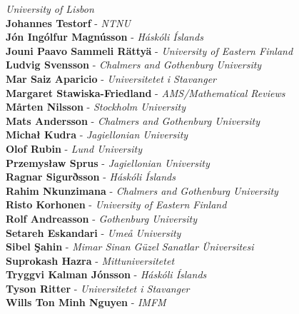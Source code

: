 \documentclass[12pt, openany]{report}      %
\begin{document}
\textit{University of Lisbon}
\\
\textbf{Johannes Testorf} -
\textit{NTNU}
\\
\textbf{Jón Ingólfur Magnússon} -
\textit{Háskóli Íslands}
\\
\textbf{Jouni Paavo Sammeli Rättyä} -
\textit{University of Eastern Finland}
\\
\textbf{Ludvig Svensson} -
\textit{Chalmers and Gothenburg University}
\\
\textbf{Mar Saiz Aparicio} -
\textit{Universitetet i Stavanger}
\\
\textbf{Margaret Stawiska-Friedland} -
\textit{AMS/Mathematical Reviews}
\\
\textbf{Mårten Nilsson} -
\textit{Stockholm University}
\\
\textbf{Mats Andersson} -
\textit{Chalmers and Gothenburg University}
\\
\textbf{Michał Kudra} -
\textit{Jagiellonian University}
\\
\textbf{Olof Rubin} -
\textit{Lund University}
\\
\textbf{Przemysław Sprus} -
\textit{Jagiellonian University}
\\
\textbf{Ragnar Sigurðsson} -
\textit{Háskóli Íslands}
\\
\textbf{Rahim Nkunzimana} -
\textit{Chalmers and Gothenburg University}
\\
\textbf{Risto Korhonen} -
\textit{University of Eastern Finland}
\\
\textbf{Rolf Andreasson} -
\textit{Gothenburg University}
\\
\textbf{Setareh Eskandari} -
\textit{Umeå University}
\\
\textbf{Sibel Şahin} -
\textit{Mimar Sinan Güzel Sanatlar Üniversitesi}
\\
\textbf{Suprokash Hazra} -
\textit{Mittuniversitetet}
\\
\textbf{Tryggvi Kalman Jónsson} -
\textit{Háskóli Íslands}
\\
\textbf{Tyson Ritter} -
\textit{Universitetet i Stavanger}
\\
\textbf{Wills Ton Minh Nguyen} -
\textit{IMFM}
\restoregeometry

\newpage
\end{document}
